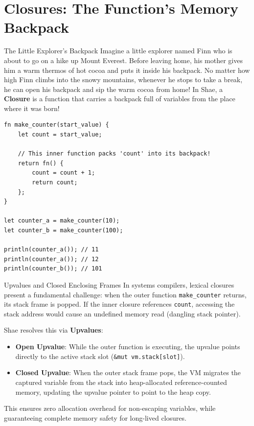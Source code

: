 \section{Closures: The Function's Memory Backpack}

\begin{kidbox}{The Little Explorer's Backpack}
Imagine a little explorer named Finn who is about to go on a hike up Mount Everest.
Before leaving home, his mother gives him a warm thermos of hot cocoa and puts it inside his backpack.
No matter how high Finn climbs into the snowy mountains, whenever he stops to take a break, he can open his backpack and sip the warm cocoa from home!
In Shae, a \textbf{Closure} is a function that carries a backpack full of variables from the place where it was born!
\begin{lstlisting}[language=shaelang]
fn make_counter(start_value) {
    let count = start_value;
    
    // This inner function packs 'count' into its backpack!
    return fn() {
        count = count + 1;
        return count;
    };
}

let counter_a = make_counter(10);
let counter_b = make_counter(100);

println(counter_a()); // 11
println(counter_a()); // 12
println(counter_b()); // 101
\end{lstlisting}
\end{kidbox}

\begin{deepbox}{Upvalues and Closed Enclosing Frames}
In systems compilers, lexical closures present a fundamental challenge: when the outer function \texttt{make\_counter} returns, its stack frame is popped. If the inner closure references \texttt{count}, accessing the stack address would cause an undefined memory read (dangling stack pointer).

Shae resolves this via \textbf{Upvalues}:
\begin{itemize}
    \item \textbf{Open Upvalue}: While the outer function is executing, the upvalue points directly to the active stack slot (\texttt{\&mut vm.stack[slot]}).
    \item \textbf{Closed Upvalue}: When the outer stack frame pops, the VM migrates the captured variable from the stack into heap-allocated reference-counted memory, updating the upvalue pointer to point to the heap copy.
\end{itemize}
This ensures zero allocation overhead for non-escaping variables, while guaranteeing complete memory safety for long-lived closures.
\end{deepbox}

